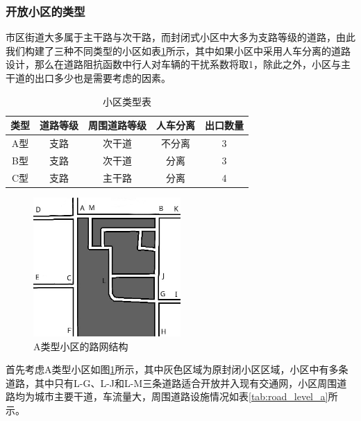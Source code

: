 \documentclass[fontset=fandol,a4paper,12pt]{ctexart}
\begin{document}
		\subsubsection{开放小区的类型}
		市区街道大多属于主干路与次干路，而封闭式小区中大多为支路等级的道路，由此我们构建了三种不同类型的小区如表\ref{tab:apartment_type}所示，其中如果小区中采用人车分离的道路设计，那么在道路阻抗函数中行人对车辆的干扰系数将取1，除此之外，小区与主干道的出口多少也是需要考虑的因素。
		\begin{table}[!htbp]
			\centering
			\caption{小区类型表}
			\label{tab:apartment_type}
			\begin{tabular}{c|cccc}
				\toprule[1pt] 
				类型 & 道路等级 & 周围道路等级 & 人车分离 & 出口数量 \\ 
				\hline 
				A型 & 支路 & 次干道 & 不分离 &  3\\ 
				B型 & 支路 & 次干道 &  分离&  3\\ 
				C型 & 支路 & 主干路 &  分离&  4\\ 
				\bottomrule[1pt]
				\end{tabular} 
		\end{table}
		\begin{figure}[!htbp]
			\centering
			\includegraphics[width=0.5\textwidth]{pic/net_a.jpg}
			\caption{A类型小区的路网结构}
			\label{fig:net_a}
		\end{figure}		
		
		首先考虑A类型小区如图\ref{fig:net_a}所示，其中灰色区域为原封闭小区区域，小区中有多条道路，其中只有L-G、L-J和L-M三条道路适合开放并入现有交通网，小区周围道路均为城市主要干道，车流量大，周围道路设施情况如表\ref{tab:road_level_a}所示。
		
\end{document}
